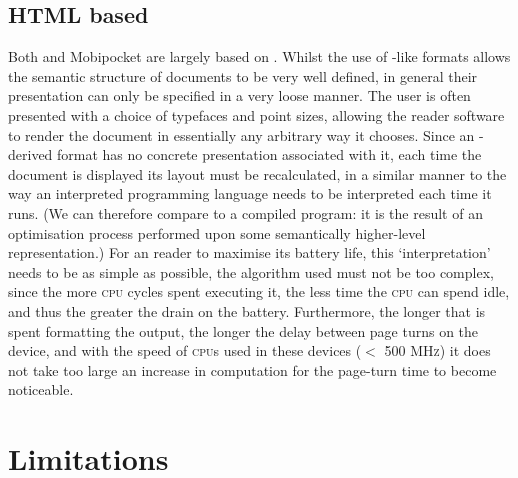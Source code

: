 \subsection{HTML based}
\label{html-format}
Both \epub{} and Mobipocket are largely based on \html{}. Whilst the use of \xml{}-like formats
allows the semantic structure of documents to be very well defined, in general their presentation
can only be specified in a very loose manner. The user is often presented with a choice of typefaces
and point sizes, allowing the reader software to render the document in essentially any arbitrary
way it chooses. Since an \html{}-derived format has no concrete presentation associated with it,
each time the document is displayed its layout must be recalculated, in a similar manner to the way
an interpreted programming language needs to be interpreted each time it runs. (We can therefore
compare \pdf{} to a compiled program: it is the result of an optimisation process performed upon
some semantically higher-level representation.) For an \ebook{} reader to maximise its battery life,
this `interpretation' needs to be as simple as possible, \ie{} the algorithm used must not be too
complex, since the more \textsc{cpu} cycles spent executing it, the
less time the \textsc{cpu} can spend idle, and thus the greater the drain on the battery.
Furthermore, the longer that is spent formatting the output, the longer the delay between page turns
on the device, and with the speed of \textsc{cpu}s used in these devices ($<$ 500 \textsc{MHz}) it
does not take too large an increase in computation for the page-turn time to become noticeable.



\section{Limitations}



